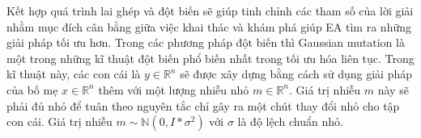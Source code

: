 Kết hợp quá trình lai ghép và đột biến sẽ giúp tinh chỉnh các tham số của lời giải nhằm mục đích cân bằng giữa việc khai thác và khám phá giúp EA tìm ra những giải pháp tối ưu hơn. Trong các phương pháp đột biến thì Gaussian mutation là một trong những kĩ thuật đột biến phổ biến nhất trong tối ưu hóa liên tục. Trong kĩ thuật này, các con cái là $y \in \mathbb{R}^n$ sẽ được xây dựng bằng cách sử dụng giải pháp của bố mẹ $x \in \mathbb{R} ^ n$ thêm với một lượng nhiễu nhỏ $m \in \mathbb{R}^n$. Giá trị nhiễu $m$ này sẽ phải đủ nhỏ để tuân theo nguyên tắc chỉ gây ra một chút thay đổi nhỏ cho tập con cái. Giá trị nhiễu $m \sim \mathbb{N}(0, I*\sigma^2)$ với $\sigma$ là độ lệch chuẩn nhỏ.